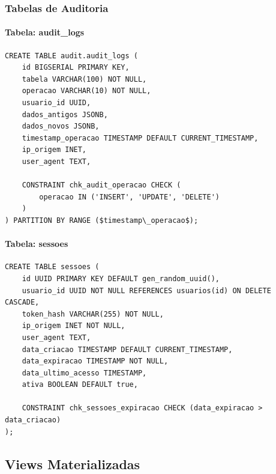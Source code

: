 \subsubsection{Tabelas de Auditoria}

\paragraph{Tabela: audit\_logs}
\begin{lstlisting}[caption=Estrutura da tabela audit_logs]
CREATE TABLE audit.audit_logs (
    id BIGSERIAL PRIMARY KEY,
    tabela VARCHAR(100) NOT NULL,
    operacao VARCHAR(10) NOT NULL,
    usuario_id UUID,
    dados_antigos JSONB,
    dados_novos JSONB,
    timestamp_operacao TIMESTAMP DEFAULT CURRENT_TIMESTAMP,
    ip_origem INET,
    user_agent TEXT,
    
    CONSTRAINT chk_audit_operacao CHECK (
        operacao IN ('INSERT', 'UPDATE', 'DELETE')
    )
) PARTITION BY RANGE ($timestamp\_operacao$);
\end{lstlisting}

\paragraph{Tabela: sessoes}
\begin{lstlisting}[caption=Estrutura da tabela sessoes]
CREATE TABLE sessoes (
    id UUID PRIMARY KEY DEFAULT gen_random_uuid(),
    usuario_id UUID NOT NULL REFERENCES usuarios(id) ON DELETE CASCADE,
    token_hash VARCHAR(255) NOT NULL,
    ip_origem INET NOT NULL,
    user_agent TEXT,
    data_criacao TIMESTAMP DEFAULT CURRENT_TIMESTAMP,
    data_expiracao TIMESTAMP NOT NULL,
    data_ultimo_acesso TIMESTAMP,
    ativa BOOLEAN DEFAULT true,
    
    CONSTRAINT chk_sessoes_expiracao CHECK (data_expiracao > data_criacao)
);
\end{lstlisting}

\subsection{Views Materializadas}

